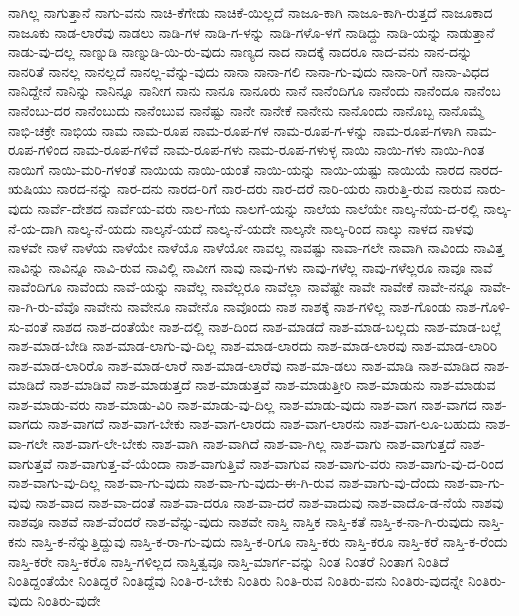 {ನಾಗಿಲ್ಲ
ನಾಗುತ್ತಾನೆ
ನಾಗು-ವನು
ನಾಚಿ-ಕೆಗೇಡು
ನಾಚಿಕೆ-ಯಿಲ್ಲದೆ
ನಾಜೂ-ಕಾಗಿ
ನಾಜೂ-ಕಾಗಿ-ರುತ್ತದೆ
ನಾಜೂಕಾದ
ನಾಜೂಕು
ನಾಡ-ಲಾರೆವು
ನಾಡಲು
ನಾಡಿ-ಗಳ
ನಾಡಿ-ಗ-ಳನ್ನು
ನಾಡಿ-ಗಳೊ-ಳಗೆ
ನಾಡಿದ್ದು
ನಾಡಿ-ಯನ್ನು
ನಾಡುತ್ತಾನೆ
ನಾಡು-ವು-ದಲ್ಲ
ನಾಣ್ನುಡಿ
ನಾಣ್ನುಡಿ-ಯಿ-ರು-ವುದು
ನಾಣ್ಯದ
ನಾದ
ನಾದಕ್ಕೆ
ನಾದರೂ
ನಾದ-ವನು
ನಾನ-ದನ್ನು
ನಾನರಿತೆ
ನಾನಲ್ಲ
ನಾನಲ್ಲದೆ
ನಾನಲ್ಲ-ವೆನ್ನು-ವುದು
ನಾನಾ
ನಾನಾ-ಗಲಿ
ನಾನಾ-ಗು-ವುದು
ನಾನಾ-ರಿಗೆ
ನಾನಾ-ವಿಧದ
ನಾನಿದ್ದೇನೆ
ನಾನಿನ್ನು
ನಾನಿನ್ನೂ
ನಾನೀಗ
ನಾನು
ನಾನೂ
ನಾನೂರು
ನಾನೆ
ನಾನೆಂದಿಗೂ
ನಾನೆಂದು
ನಾನೆಂದೂ
ನಾನೆಂಬ
ನಾನೆಂಬು-ದರ
ನಾನೆಂಬುದು
ನಾನೆಂಬುವ
ನಾನೆಷ್ಟು
ನಾನೇ
ನಾನೇಕೆ
ನಾನೇನು
ನಾನೊಂದು
ನಾನೊಬ್ಬ
ನಾನೊಮ್ಮೆ
ನಾಭಿ-ಚಕ್ರೇ
ನಾಭಿಯ
ನಾಮ
ನಾಮ-ರೂಪ
ನಾಮ-ರೂಪ-ಗಳ
ನಾಮ-ರೂಪ-ಗ-ಳನ್ನು
ನಾಮ-ರೂಪ-ಗಳಾಗಿ
ನಾಮ-ರೂಪ-ಗಳಿಂದ
ನಾಮ-ರೂಪ-ಗಳಿವೆ
ನಾಮ-ರೂಪ-ಗಳು
ನಾಮ-ರೂಪ-ಗಳುಳ್ಳ
ನಾಯಿ
ನಾಯಿ-ಗಳು
ನಾಯಿ-ಗಿಂತ
ನಾಯಿಗೆ
ನಾಯಿ-ಮರಿ-ಗಳಂತೆ
ನಾಯಿಯ
ನಾಯಿ-ಯಂತೆ
ನಾಯಿ-ಯನ್ನು
ನಾಯಿ-ಯಷ್ಟು
ನಾಯಿಯೆ
ನಾರದ
ನಾರದ-ಋಷಿಯು
ನಾರದ-ನನ್ನು
ನಾರ-ದನು
ನಾರದ-ರಿಗೆ
ನಾರ-ದರು
ನಾರ-ದರೆ
ನಾರಿ-ಯರು
ನಾರುತ್ತಿ-ರುವ
ನಾರುವ
ನಾರು-ವುದು
ನಾರ್ವೆ-ದೇಶದ
ನಾರ್ವೆಯ-ವರು
ನಾಲ-ಗೆಯ
ನಾಲಗೆ-ಯನ್ನು
ನಾಲೆಯ
ನಾಲೆಯೇ
ನಾಲ್ಕ-ನೆಯ-ದ-ರಲ್ಲಿ
ನಾಲ್ಕ-ನೆ-ಯ-ದಾಗಿ
ನಾಲ್ಕ-ನೆ-ಯದು
ನಾಲ್ಕನೆ-ಯದೆ
ನಾಲ್ಕ-ನೆ-ಯದೇ
ನಾಲ್ಕನೇ
ನಾಲ್ಕ-ರಿಂದ
ನಾಲ್ಕು
ನಾಳದ
ನಾಳವು
ನಾಳವೇ
ನಾಳೆ
ನಾಳೆಯ
ನಾಳೆಯೇ
ನಾಳೆಯೊ
ನಾಳೆಯೋ
ನಾವಲ್ಲ
ನಾವಷ್ಟು
ನಾವಾ-ಗಲೇ
ನಾವಾಗಿ
ನಾವಿಂದು
ನಾವಿತ್ತ
ನಾವಿನ್ನು
ನಾವಿನ್ನೂ
ನಾವಿ-ರುವ
ನಾವಿಲ್ಲಿ
ನಾವೀಗ
ನಾವು
ನಾವು-ಗಳು
ನಾವು-ಗಳೆಲ್ಲ
ನಾವು-ಗಳೆಲ್ಲರೂ
ನಾವೂ
ನಾವೆ
ನಾವೆಂದಿಗೂ
ನಾವೆಂದು
ನಾವೆ-ಯನ್ನು
ನಾವೆಲ್ಲ
ನಾವೆಲ್ಲರೂ
ನಾವೆಲ್ಲಾ
ನಾವೆಷ್ಟೇ
ನಾವೇ
ನಾವೇಕೆ
ನಾವೇ-ನನ್ನೂ
ನಾವೇ-ನಾ-ಗಿ-ರು-ವೆವೊ
ನಾವೇನು
ನಾವೇನೂ
ನಾವೇನೊ
ನಾವೊಂದು
ನಾಶ
ನಾಶಕ್ಕೆ
ನಾಶ-ಗಳಿಲ್ಲ
ನಾಶ-ಗೊಂಡು
ನಾಶ-ಗೊಳಿ-ಸು-ವಂತೆ
ನಾಶದ
ನಾಶ-ದಂತೆಯೇ
ನಾಶ-ದಲ್ಲಿ
ನಾಶ-ದಿಂದ
ನಾಶ-ಮಾಡದೆ
ನಾಶ-ಮಾಡ-ಬಲ್ಲದು
ನಾಶ-ಮಾಡ-ಬಲ್ಲೆ
ನಾಶ-ಮಾಡ-ಬೇಡಿ
ನಾಶ-ಮಾಡ-ಲಾಗು-ವು-ದಿಲ್ಲ
ನಾಶ-ಮಾಡ-ಲಾರದು
ನಾಶ-ಮಾಡ-ಲಾರವು
ನಾಶ-ಮಾಡ-ಲಾರಿರಿ
ನಾಶ-ಮಾಡ-ಲಾರಿರೊ
ನಾಶ-ಮಾಡ-ಲಾರೆ
ನಾಶ-ಮಾಡ-ಲಾರೆವು
ನಾಶ-ಮಾ-ಡಲು
ನಾಶ-ಮಾಡಿ
ನಾಶ-ಮಾಡಿದ
ನಾಶ-ಮಾಡಿದೆ
ನಾಶ-ಮಾಡಿವೆ
ನಾಶ-ಮಾಡುತ್ತದೆ
ನಾಶ-ಮಾಡುತ್ತವೆ
ನಾಶ-ಮಾಡುತ್ತೀರಿ
ನಾಶ-ಮಾಡುನು
ನಾಶ-ಮಾಡುವ
ನಾಶ-ಮಾಡು-ವರು
ನಾಶ-ಮಾಡು-ವಿರಿ
ನಾಶ-ಮಾಡು-ವು-ದಿಲ್ಲ
ನಾಶ-ಮಾಡು-ವುದು
ನಾಶ-ವಾಗ
ನಾಶ-ವಾಗದ
ನಾಶ-ವಾಗದು
ನಾಶ-ವಾಗದೆ
ನಾಶ-ವಾಗ-ಬೇಕು
ನಾಶ-ವಾಗ-ಲಾರದು
ನಾಶ-ವಾಗ-ಲಾರನು
ನಾಶ-ವಾಗ-ಲೂ-ಬಹುದು
ನಾಶ-ವಾ-ಗಲೇ
ನಾಶ-ವಾಗ-ಲೇ-ಬೇಕು
ನಾಶ-ವಾಗಿ
ನಾಶ-ವಾಗಿದೆ
ನಾಶ-ವಾ-ಗಿಲ್ಲ
ನಾಶ-ವಾಗು
ನಾಶ-ವಾಗುತ್ತದೆ
ನಾಶ-ವಾಗುತ್ತವೆ
ನಾಶ-ವಾಗುತ್ತ-ವೆ-ಯೆಂದಾ
ನಾಶ-ವಾಗುತ್ತಿವೆ
ನಾಶ-ವಾಗುವ
ನಾಶ-ವಾಗು-ವರು
ನಾಶ-ವಾಗು-ವು-ದ-ರಿಂದ
ನಾಶ-ವಾಗು-ವು-ದಿಲ್ಲ
ನಾಶ-ವಾ-ಗು-ವುದು
ನಾಶ-ವಾ-ಗು-ವುದು-ಈ-ಗಿ-ರುವ
ನಾಶ-ವಾಗು-ವು-ದೆಂದು
ನಾಶ-ವಾ-ಗು-ವುವು
ನಾಶ-ವಾದ
ನಾಶ-ವಾ-ದಂತೆ
ನಾಶ-ವಾ-ದರೂ
ನಾಶ-ವಾ-ದರೆ
ನಾಶ-ವಾದುವು
ನಾಶ-ವಾದೊ-ಡ-ನೆಯೆ
ನಾಶವು
ನಾಶವೂ
ನಾಶವೆ
ನಾಶ-ವೆಂದರೆ
ನಾಶ-ವೆನ್ನು-ವುದು
ನಾಶವೇ
ನಾಸ್ತಿ
ನಾಸ್ತಿಕ
ನಾಸ್ತಿ-ಕತೆ
ನಾಸ್ತಿ-ಕ-ನಾ-ಗಿ-ರುವುದು
ನಾಸ್ತಿ-ಕನು
ನಾಸ್ತಿ-ಕ-ನೆನ್ನುತ್ತಿದ್ದುವು
ನಾಸ್ತಿ-ಕ-ರಾ-ಗು-ವುದು
ನಾಸ್ತಿ-ಕ-ರಿಗೂ
ನಾಸ್ತಿ-ಕರು
ನಾಸ್ತಿ-ಕರೂ
ನಾಸ್ತಿ-ಕರೆ
ನಾಸ್ತಿ-ಕ-ರೆಂದು
ನಾಸ್ತಿ-ಕರೇ
ನಾಸ್ತಿ-ಕರೊ
ನಾಸ್ತಿ-ಗಳಿಲ್ಲದ
ನಾಸ್ತಿತ್ವವೂ
ನಾಸ್ತಿ-ಮಾರ್ಗ-ವನ್ನು
ನಿಂತ
ನಿಂತರೆ
ನಿಂತಾಗ
ನಿಂತಿದೆ
ನಿಂತಿದ್ದಂತೆಯೇ
ನಿಂತಿದ್ದರೆ
ನಿಂತಿದ್ದೆವು
ನಿಂತಿ-ರ-ಬೇಕು
ನಿಂತಿರು
ನಿಂತಿ-ರುವ
ನಿಂತಿರು-ವನು
ನಿಂತಿರು-ವುದನ್ನೇ
ನಿಂತಿರು-ವುದು
ನಿಂತಿರು-ವುದೇ
}
